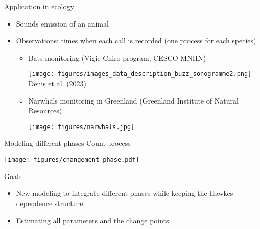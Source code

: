 \documentclass[french,english]{beamer}
\begin{document}
\begin{frame}{Application in ecology}

\begin{itemize}
    \item Sounds emission of an animal
    \item Observations: times when each call is recorded (one process for each species)

\begin{itemize}
    \item  Bats  monitoring (Vigie-Chiro program, CESCO-MNHN)


\begin{center}
      \texttt{[image: figures/images\_data\_description\_buzz\_sonogramme2.png]}  \\
   \footnotesize{Denis et al. (2023)} 
\end{center}
 


\vspace{0.3cm}

\item Narwhals monitoring in Greenland (Greenland Institute of Natural Resources)

\vspace{0.1cm}
\centering
  \texttt{[image: figures/narwhals.jpg]}
\end{itemize}
  \end{itemize}
  
\end{frame}
\begin{frame}{Modeling different phases}
\centering 
\footnotesize{Count process} 

\vspace{-0.2cm}

    \texttt{[image: figures/changement\_phase.pdf]}

    \begin{block}{Goals}
    \begin{itemize}
        \item New modeling to integrate different phases while keeping the Hawkes dependence structure
        \item Estimating all parameters and the change points
    \end{itemize}
        
    \end{block}
\end{frame}
\end{document}
